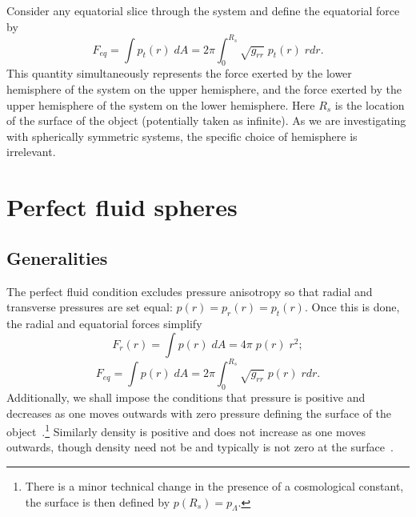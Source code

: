 \documentclass[12pt]{article}
\begin{document}
\enlargethispage{20pt}
Consider any equatorial slice through the system and define the equatorial force by
\begin{equation}
    F_{eq} = \int p_t(r) \; dA = 2\pi \int^{R_s}_{0} \sqrt{g_{rr}} \; p_t(r) \; r dr.
    \label{eq:Equatorial Force}
\end{equation}
This quantity simultaneously represents the force exerted by the lower hemisphere of the system on the upper hemisphere, and the force exerted by the upper hemisphere of the system on the lower hemisphere. 
Here $R_s$ is the location of the surface of the object (potentially taken as infinite). As we are investigating with spherically symmetric systems, the specific choice of hemisphere is irrelevant.


\section{Perfect fluid spheres}\label{C:PF}
\subsection{Generalities}\label{SS:generalities}

The perfect fluid condition excludes pressure anisotropy so that radial and transverse pressures are set equal: $p(r) = p_r(r) = p_t(r)$. Once this is done, the radial and equatorial forces simplify
\begin{equation}
    F_r(r) = \int p(r) \; dA = 4\pi \;p(r) \; r^2;
    \label{eq:Radial Force2}
\end{equation}
\begin{equation}
    F_{eq} = \int p(r) \; dA = 2\pi \int^{R_s}_{0} \sqrt{g_{rr}} \; p(r) \; r dr.
    \label{eq:Equatorial Force2}
\end{equation}
Additionally, we shall impose the conditions that pressure is positive and decreases as one moves outwards with zero pressure defining the surface of the object~\cite{Delgaty, Rahman:2001, Martin:2003-a, Martin:2003-b, Boonserm:2005, Boonserm:2006-a, Boonserm:2006-b, Boonserm:2007-1, Boonserm:2007-2}.\footnote{There is a minor technical change in the presence of a cosmological constant, the surface is then defined by $p(R_s) = p_\Lambda$.}
Similarly density is positive and does not increase as one moves outwards, though density need not be and typically is not zero at the surface~\cite{Delgaty, Rahman:2001, Martin:2003-a, Martin:2003-b, Boonserm:2005, Boonserm:2006-a, Boonserm:2006-b, Boonserm:2007-1, Boonserm:2007-2}.
\end{document}
